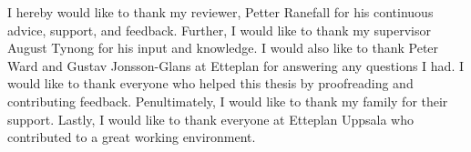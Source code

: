 \begin{acknowledgements}
    I hereby would like to thank my reviewer, Petter Ranefall for his continuous advice, support, and feedback. Further, I would like to thank my supervisor August Tynong for his input and knowledge. I would also like to thank Peter Ward and Gustav Jonsson-Glans at Etteplan for answering any questions I had. I would like to thank everyone who helped this thesis by proofreading and contributing feedback. Penultimately, I would like to thank my family for their support. Lastly, I would like to thank everyone at Etteplan Uppsala who contributed to a great working environment. 

\end{acknowledgements}
  

